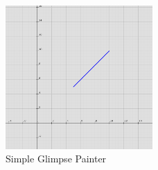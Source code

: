 \documentclass[12pt]{article}
\begin{document}
\begin{figure}
  \centering
    \includegraphics[width=0.5\textwidth]{images/simple_painter.png}
  \caption{Simple Glimpse Painter}
\label{simplepainter}
\end{figure}
\end{document}
